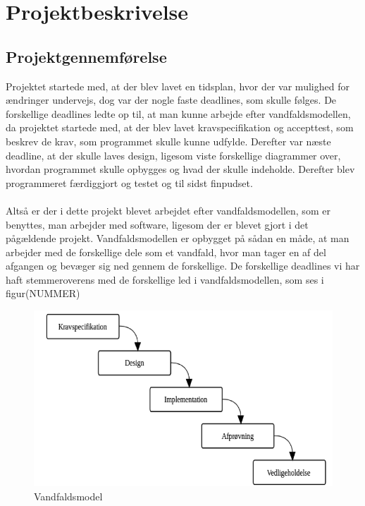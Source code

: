 \chapter{Projektbeskrivelse}

\section{Projektgennemførelse}
Projektet startede med, at der blev lavet en tidsplan, hvor der var mulighed for ændringer undervejs, dog var der nogle faste deadlines, som skulle følges. De forskellige deadlines ledte op til, at man kunne arbejde efter vandfaldsmodellen, da projektet startede med, at der blev lavet kravspecifikation og accepttest, som beskrev de krav, som programmet skulle kunne udfylde. Derefter var næste deadline, at der skulle laves design, ligesom viste forskellige diagrammer over, hvordan programmet skulle opbygges og hvad der skulle indeholde. Derefter blev programmeret færdiggjort og testet og til sidst finpudset. \\ \\
Altså er der i dette projekt blevet arbejdet efter vandfaldsmodellen, som er benyttes, man arbejder med software, ligesom der er blevet gjort i det pågældende projekt. Vandfaldsmodellen er opbygget på sådan en måde, at man arbejder med de forskellige dele som et vandfald, hvor man tager en af del afgangen og bevæger sig ned gennem de forskellige. De forskellige deadlines vi har haft stemmeroverens med de forskellige led i vandfaldsmodellen, som ses i figur(NUMMER)

\begin{figure}[H]
	\centering
	\includegraphics[width=1\textwidth]{Figurer/Snip20150522_15}
	\caption{Vandfaldsmodel}
\end{figure}

